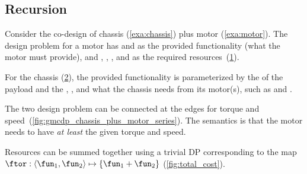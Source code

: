 

\FloatBarrier\vfill\clearpage %

\subsection{Recursion}

\begin{example}
    \label{exa:chassis_plus_motor}
    Consider the co-design of chassis (\cref{exa:chassis}) plus motor (\cref{exa:motor}).
    The design problem for a motor has  and  as the provided functionality (what the motor must provide), and , , , and  as the required resources~(\cref{fig:motor}).

    \begin{figure}[h!]
        \centering
        \caption{\label{fig:motor}}
    \end{figure}


    For the chassis (\cref{fig:gmcdp_chassis}), the provided functionality is parameterized by the  of the payload and the , , and what the chassis needs from its motor(s), such as  and .

    \begin{figure}[h!]
        \centering
        \caption{\label{fig:gmcdp_chassis}}
    \end{figure}


    The two design problem can be connected at the edges for torque and speed~(\cref{fig:gmcdp_chassis_plus_motor_series}).
    The semantics is that the motor needs to have \emph{at least} the given torque and speed.


    \begin{figure*}[h!]
        \centering
        \caption{\label{fig:gmcdp_chassis_plus_motor_series}}
    \end{figure*}

    Resources can be summed together using a trivial DP corresponding
    to the map $\ftor:\left\langle \fun_{1},\fun_{2}\right\rangle \mapsto\{\fun_{1}+\fun_{2}\}$
    (\cref{fig:total_cost}).


\end{example}
